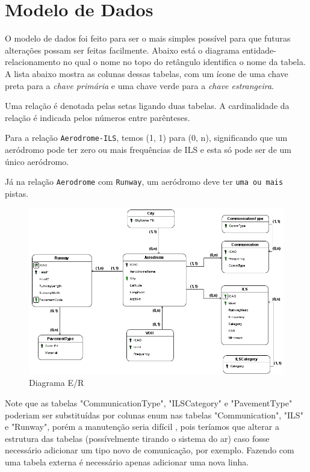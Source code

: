 \chapter{Modelo de Dados}

O modelo de dados foi feito para ser o mais simples possível para que futuras alterações
possam ser feitas facilmente. Abaixo está o diagrama entidade-relacionamento no qual
o nome no topo do retângulo identifica o nome da tabela. A lista abaixo mostra
as colunas dessas tabelas, com um ícone de uma chave preta para a \textit{chave primária} e 
uma chave verde para a \textit{chave estrangeira}.

Uma relação é denotada pelas setas ligando duas tabelas. A cardinalidade da relação é indicada
pelos números entre parênteses. 

Para a relação \texttt{Aerodrome-ILS}, temos (1, 1) para (0, n), significando que um aeródromo pode
ter zero ou mais frequências de ILS e esta só pode ser de um único aeródromo.

Já na relação \texttt{Aerodrome} com \texttt{Runway}, um aeródromo deve ter \texttt{uma ou mais} pistas.


\begin{figure}[ht]
    \begin{center}
    \includegraphics[width=400pt]{img/ERAero.png}
    \caption{Diagrama E/R}
    \label{fig:diagrama-er}
    \end{center}
\end{figure}

Note que as tabelas "CommunicationType", "ILSCategory" e "PavementType" poderiam ser substituídas
por colunas enum nas tabelas "Communication", "ILS" e "Runway", porém a manutenção seria difícil
\cite{table-enum},
pois teríamos que alterar a estrutura das tabelas (possívelmente tirando o sistema do ar) caso 
fosse necessário adicionar um tipo novo
de comunicação, por exemplo. Fazendo com uma tabela externa é necessário apenas adicionar uma nova
linha.

